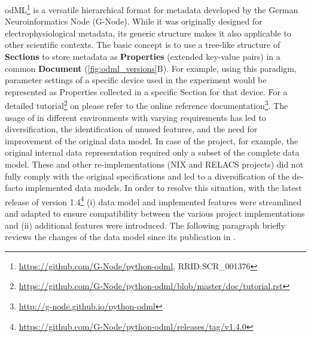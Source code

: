 odML\footnote{\url{https://github.com/G-Node/python-odml}, RRID:SCR\_001376} is a versatile hierarchical format for metadata \citep{Grewe_2011} developed by the German Neuroinformatics Node (G-Node). While it was originally designed for electrophysiological metadata, its generic structure makes it also applicable to other scientific contexts.
% 
The basic concept is to use a tree-like structure of \textbf{Sections} to store metadata as \textbf{Properties} (extended key-value pairs) in a common \textbf{Document} (\cref{fig:odml_versions}B). For example, using this paradigm,  parameter settings of a specific device used in the experiment would be represented as Properties collected in a specific Section for that device. For a detailed tutorial\footnote{\url{https://github.com/G-Node/python-odml/blob/master/doc/tutorial.rst}} on  please refer to the online reference documentation\footnote{\url{http://g-node.github.io/python-odml}}. The usage of  in different environments with varying requirements has led to diversification, the identification of unused features, and the need for improvement of the original data model. In case of the  project, for example, the original internal data representation required only a subset of the complete  data model. These and other re-implementations (NIX and RELACS projects) did not fully comply with the original specifications and led to a diversification of the de-facto implemented data models. In order to resolve this situation, with the latest release of  version 1.4\footnote{\url{https://github.com/G-Node/python-odml/releases/tag/v1.4.0}} (i) data model and implemented features were streamlined and adapted to ensure compatibility between the various project implementations and (ii) additional features were introduced. The following paragraph briefly reviews the changes of the data model since its publication in \cite{Grewe_2011}.

